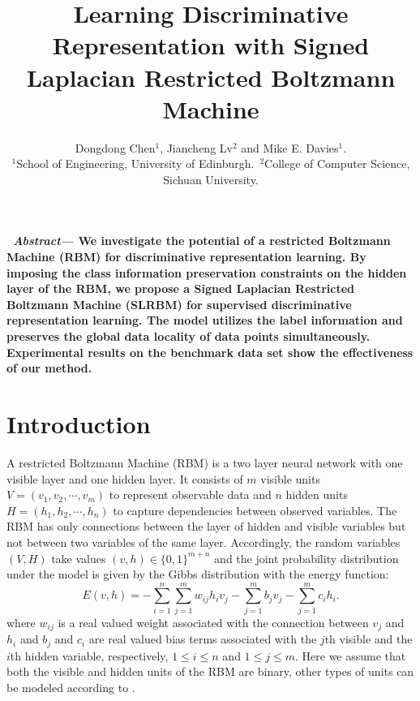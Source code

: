 \documentclass[a4paper,10pt,twocolumn]{article}
\title{Learning Discriminative Representation with Signed Laplacian Restricted Boltzmann Machine}
\author{Dongdong Chen$^1$, Jiancheng Lv$^2$ and Mike E. Davies$^{1}$.\\
  \footnotesize $^1$School of Engineering, University of Edinburgh.\ $^2$College of Computer Science, Sichuan University.} \date{\empty} %
\renewenvironment{abstract}{\bf\small {\em\ Abstract---}}{}
\begin{document}
\maketitle

\begin{abstract}
We investigate the potential of a restricted Boltzmann Machine (RBM) for discriminative representation learning. By imposing the class information preservation constraints on the hidden layer of the RBM, we propose a Signed Laplacian Restricted Boltzmann Machine (SLRBM) for supervised discriminative representation learning. The model utilizes the label information and preserves the global data locality of data points simultaneously. Experimental results on the benchmark data set show the effectiveness of our method.
\end{abstract}


\section{Introduction}\label{sec:introduction}

A restricted Boltzmann Machine (RBM) \cite{smolensky1986information}  is a two layer neural network with one visible layer and one hidden layer. It consists of $m$ visible units $V = (v_1, v_2, \cdots, v_m)$ to represent observable data and $n$ hidden units $H = (h_1, h_2,\cdots,h_n)$ to capture dependencies between observed variables. The RBM has only connections between the layer of hidden and visible variables but not between two variables of the same layer. Accordingly, the random variables $(V, H)$ take values $(v, h)\in \{0,1\}^{m+n}$ and the joint probability distribution under the model is given by the Gibbs distribution
with the energy function:
\begin{equation}\label{eqs:Erbm}
    E(v,h) = -\sum_{i=1}^n\sum_{j=1}^mw_{ij}h_iv_j- \sum_{j=1}^mb_jv_j - \sum_{j=1}^mc_ih_i.
\end{equation}
where $w_{ij}$ is a real valued weight associated with the connection between $v_j$ and $h_i$ and $b_j$ and $c_i$ are real valued bias terms associated with the $j$th visible and the $i$th hidden variable, respectively, $1\leq i\leq n$ and $1\leq j\leq m$. Here we assume that both the visible and hidden units of the RBM are binary, other types of units can be modeled according to \cite{welling2005exponential}.
\end{document}
